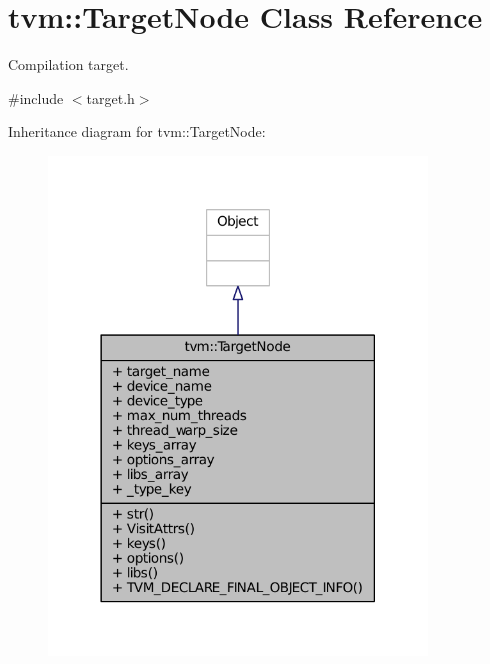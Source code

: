 \hypertarget{classtvm_1_1TargetNode}{}\section{tvm\+:\+:Target\+Node Class Reference}
\label{classtvm_1_1TargetNode}


Compilation target.  




{\ttfamily \#include $<$target.\+h$>$}



Inheritance diagram for tvm\+:\+:Target\+Node\+:
\nopagebreak
\begin{figure}[H]
\begin{center}
\leavevmode
\includegraphics[width=285pt]{classtvm_1_1TargetNode__inherit__graph}
\end{center}
\end{figure}


